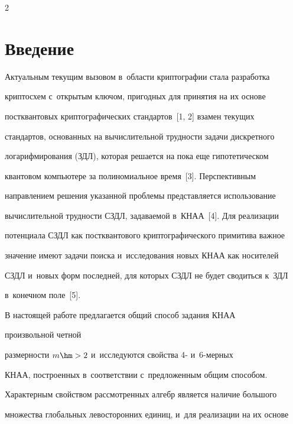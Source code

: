 \begin{multicols}{2}





\label{st\stat}





\section{Введение}





  Актуальным текущим вызовом в~области крип\-то\-гра\-фии стала разработка 


криптосхем с~открытым ключом, пригодных для принятия на их основе 


постквантовых криптографических стандартов~[1, 2] взамен текущих 


стандартов, основанных на вычислительной трудности задачи дискретного 


логарифмирования (ЗДЛ), которая решается на пока еще гипотетическом 


квантовом компьютере за полиномиальное время~[3]. Перспективным 


на\-прав\-ле\-ни\-ем решения указанной проб\-ле\-мы пред\-став\-ля\-ет\-ся использование 


вычислительной трудности СЗДЛ, за\-да\-ва\-емой в~КНАА~[4]. Для реализации 


потенциала СЗДЛ как постквантового криптографического примитива важное 


значение имеют задачи поиска и~исследования новых КНАА как носителей 


СЗДЛ и~новых форм последней, для которых СЗДЛ не будет сводиться к~ЗДЛ 


в~конечном поле~[5]. 


  


  В настоящей работе предлагается общий способ задания КНАА 


  произвольной четной 


размерности $m\hm> 2$ и~исследуются свойства 4- и~6-мер\-ных 


КНАА, построенных в~соответствии с~предложенным общим способом. 


Характерным свойством рас\-смот\-рен\-ных алгебр является наличие большого 


множества глобальных левосторонних единиц, и~для реализации на их основе 



\end{multicols}
